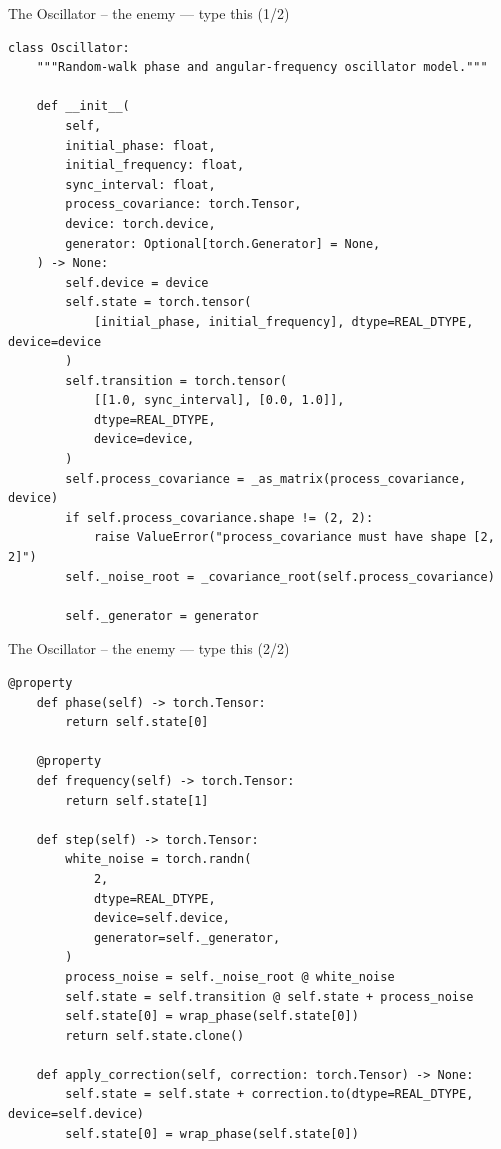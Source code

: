 \documentclass[10pt]{beamer}
\begin{document}
\begin{frame}[fragile]{The Oscillator -- the enemy --- type this (1/2)}
\begin{lstlisting}[basicstyle=\ttfamily\tiny]
class Oscillator:
    """Random-walk phase and angular-frequency oscillator model."""

    def __init__(
        self,
        initial_phase: float,
        initial_frequency: float,
        sync_interval: float,
        process_covariance: torch.Tensor,
        device: torch.device,
        generator: Optional[torch.Generator] = None,
    ) -> None:
        self.device = device
        self.state = torch.tensor(
            [initial_phase, initial_frequency], dtype=REAL_DTYPE, device=device
        )
        self.transition = torch.tensor(
            [[1.0, sync_interval], [0.0, 1.0]],
            dtype=REAL_DTYPE,
            device=device,
        )
        self.process_covariance = _as_matrix(process_covariance, device)
        if self.process_covariance.shape != (2, 2):
            raise ValueError("process_covariance must have shape [2, 2]")
        self._noise_root = _covariance_root(self.process_covariance)
        
        self._generator = generator
\end{lstlisting}
\end{frame}

\begin{frame}[fragile]{The Oscillator -- the enemy --- type this (2/2)}
\begin{lstlisting}[basicstyle=\ttfamily\tiny]
    @property
    def phase(self) -> torch.Tensor:
        return self.state[0]

    @property
    def frequency(self) -> torch.Tensor:
        return self.state[1]

    def step(self) -> torch.Tensor:
        white_noise = torch.randn(
            2,
            dtype=REAL_DTYPE,
            device=self.device,
            generator=self._generator,
        )
        process_noise = self._noise_root @ white_noise
        self.state = self.transition @ self.state + process_noise
        self.state[0] = wrap_phase(self.state[0])
        return self.state.clone()

    def apply_correction(self, correction: torch.Tensor) -> None:
        self.state = self.state + correction.to(dtype=REAL_DTYPE, device=self.device)
        self.state[0] = wrap_phase(self.state[0])
\end{lstlisting}
\end{frame}
\end{document}
